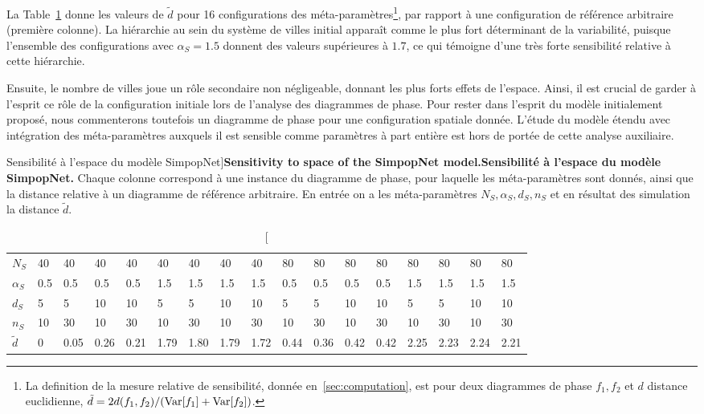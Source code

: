 La Table~\ref{tab:macrocoevolexplo:spacematters} donne les valeurs de $\tilde{d}$ pour 16 configurations des méta-paramètres\footnote{La definition de la mesure relative de sensibilité, donnée en~\ref{sec:computation}, est pour deux diagrammes de phase $f_1,f_2$ et $d$ distance euclidienne, $\tilde{d} = 2 d(f_1,f_2)/(\operatorname{Var}\!\left[f_1\right]+\operatorname{Var}\!\left[f_2\right])$.}, par rapport à une configuration de référence arbitraire (première colonne). La hiérarchie au sein du système de villes initial apparaît comme le plus fort déterminant de la variabilité, puisque l'ensemble des configurations avec $\alpha_S = 1.5$ donnent des valeurs supérieures à $1.7$, ce qui témoigne d'une très forte sensibilité relative à cette hiérarchie.

Ensuite, le nombre de villes joue un rôle secondaire non négligeable, donnant les plus forts effets de l'espace. Ainsi, il est crucial de garder à l'esprit ce rôle de la configuration initiale lors de l'analyse des diagrammes de phase. Pour rester dans l'esprit du modèle initialement proposé, nous commenterons toutefois un diagramme de phase pour une configuration spatiale donnée. L'étude du modèle étendu avec intégration des méta-paramètres auxquels il est sensible comme paramètres à part entière est hors de portée de cette analyse auxiliaire.



\begin{table}[!ht]
\caption[Sensitivity to space of the SimpopNet model][Sensibilité à l'espace du modèle SimpopNet]{\textbf{Sensitivity to space of the SimpopNet model.}\label{tab:macrocoevolexplo:spacematters}}{\textbf{Sensibilité à l'espace du modèle SimpopNet.} Chaque colonne correspond à une instance du diagramme de phase, pour laquelle les méta-paramètres sont donnés, ainsi que la distance relative à un diagramme de référence arbitraire. En entrée on a les méta-paramètres $N_S,\alpha_S,d_S,n_S$ et en résultat des simulation la distance $\tilde{d}$.\label{tab:macrocoevolexplo:spacematters}}
\begin{tabular}{|l|l|l|l|l|l|l|l|l|l|l|l|l|l|l|l|l|}
\hline
$N_S$ & 40 & 40 & 40 & 40 & 40 & 40 & 40 & 40 & 80 & 80 & 80 & 80 & 80 & 80 & 80 & 80\\
$\alpha_S$ & 0.5 & 0.5 & 0.5 & 0.5 & 1.5 & 1.5 & 1.5 & 1.5 & 0.5 & 0.5 & 0.5 & 0.5 & 1.5 & 1.5 & 1.5 & 1.5\\
$d_S$ & 5 & 5 & 10 & 10 & 5 & 5 & 10 & 10 & 5 & 5 & 10 & 10 & 5 & 5 & 10 & 10\\
$n_S$ & 10 & 30 & 10 & 30 & 10 & 30 & 10 & 30 & 10 & 30 & 10 & 30 & 10 & 30 & 10 & 30\\\hline
$\tilde{d}$ & 0 & 0.05 & 0.26 & 0.21 & 1.79 & 1.80 & 1.79 & 1.72 & 0.44 & 0.36 & 0.42 & 0.42 & 2.25 & 2.23 & 2.24 & 2.21\\\hline
\end{tabular}
\end{table}



